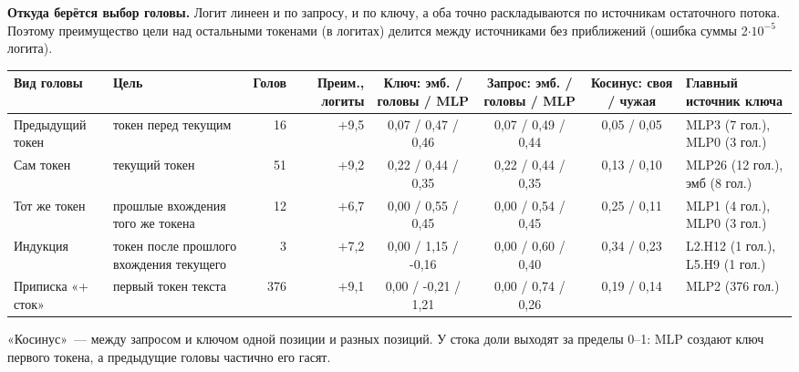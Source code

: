 \documentclass[10pt]{article}
\begin{document}
\noindent\begin{minipage}{\linewidth}
\textbf{Откуда берётся выбор головы.} Логит линеен и по запросу, и по ключу, а оба точно раскладываются по источникам остаточного потока. Поэтому преимущество цели над остальными токенами (в логитах) делится между источниками без приближений (ошибка суммы 2$\cdot 10^{-5}$ логита).
\begin{center}{\small\begin{tabular}{|l|p{3.7cm}|r|r|c|c|c|p{3.5cm}|}\hline
\rowcolor{head}\textbf{Вид головы} & \textbf{Цель} & \textbf{Голов} & \textbf{Преим., логиты} & \textbf{Ключ: эмб. / головы / MLP} & \textbf{Запрос: эмб. / головы / MLP} & \textbf{Косинус: своя / чужая} & \textbf{Главный источник ключа} \\ \hline
Предыдущий токен & токен перед текущим & 16 & $+$9,5 & 0,07 / 0,47 / 0,46 & 0,07 / 0,49 / 0,44 & 0,05 / 0,05 & MLP3 (7 гол.), MLP0 (3 гол.) \\ \hline
Сам токен & текущий токен & 51 & $+$9,2 & 0,22 / 0,44 / 0,35 & 0,22 / 0,44 / 0,35 & 0,13 / 0,10 & MLP26 (12 гол.), эмб (8 гол.) \\ \hline
Тот же токен & прошлые вхождения того же токена & 12 & $+$6,7 & 0,00 / 0,55 / 0,45 & 0,00 / 0,54 / 0,45 & 0,25 / 0,11 & MLP1 (4 гол.), MLP0 (3 гол.) \\ \hline
Индукция & токен после прошлого вхождения текущего & 3 & $+$7,2 & 0,00 / 1,15 / -0,16 & 0,00 / 0,60 / 0,40 & 0,34 / 0,23 & L2.H12 (1 гол.), L5.H9 (1 гол.) \\ \hline
Приписка «+ сток» & первый токен текста & 376 & $+$9,1 & 0,00 / -0,21 / 1,21 & 0,00 / 0,74 / 0,26 & 0,19 / 0,14 & MLP2 (376 гол.) \\ \hline
\hline\end{tabular}}\end{center}
«Косинус»~— между запросом и ключом одной позиции и разных позиций. У стока доли выходят за пределы 0–1: MLP создают ключ первого токена, а предыдущие головы частично его гасят.
\end{minipage}
\par
\end{document}
